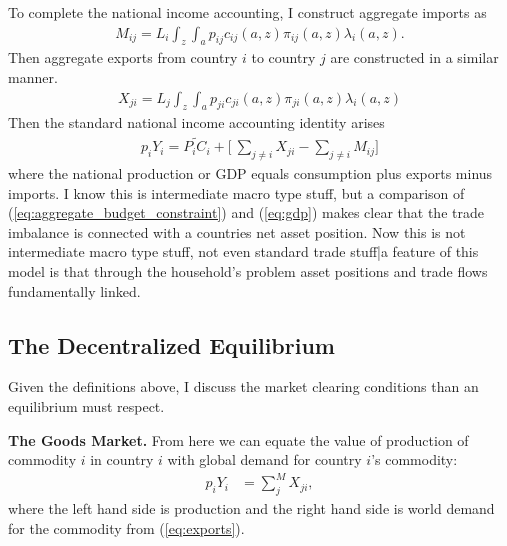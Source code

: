 \documentclass[12pt,pdftex]{article}
\begin{document}
\begin{onehalfspacing}
To complete the national income accounting, I construct aggregate imports as
\begin{align}
M_{ij} = L_i \int_{z} \int_{a}  p_{ij} c_{ij}(a, z) \pi_{ij}(a, z) \lambda_i(a, z).
\label{eq:imports}
\end{align}
Then aggregate exports from country $i$ to country $j$ are constructed in a similar manner. 
\begin{align}
X_{ji} = L_j \int_{z} \int_{a}  p_{ji} c_{ji}(a, z) \pi_{ji}(a, z) \lambda_i(a, z)
\label{eq:exports}
\end{align}
Then the standard national income accounting identity arises
\begin{align}
p_{i} Y_{i}  = \widetilde{P_{i} C_i} + \bigg[\ \sum_{j\neq i}X_{ji} -  \sum_{j\neq i}M_{ij} \bigg]
\label{eq:gdp}
\end{align}
where the national production or GDP equals consumption plus exports minus imports. I know this is intermediate macro type stuff, but a comparison of (\ref{eq:aggregate_budget_constraint}) and (\ref{eq:gdp}) makes clear that the trade imbalance is connected with a countries net asset position. Now this is not intermediate macro type stuff, not even standard trade stuff|a feature of this model is that through the household's problem asset positions and trade flows fundamentally linked. 

\subsection{The Decentralized Equilibrium}

Given the definitions above, I discuss the market clearing conditions than an equilibrium must respect.

\textbf{The Goods Market.} From here we can equate the value of production of commodity $i$ in country $i$ with global demand for country $i$'s commodity:
\begin{align}
p_{i} Y_{i} &= \sum_{j}^{M}  X_{ji} \label{eq:goods-supply},
\end{align}
where the left hand side is production and the right hand side is world demand for the commodity from (\ref{eq:exports}).


\end{onehalfspacing}
\end{document}
